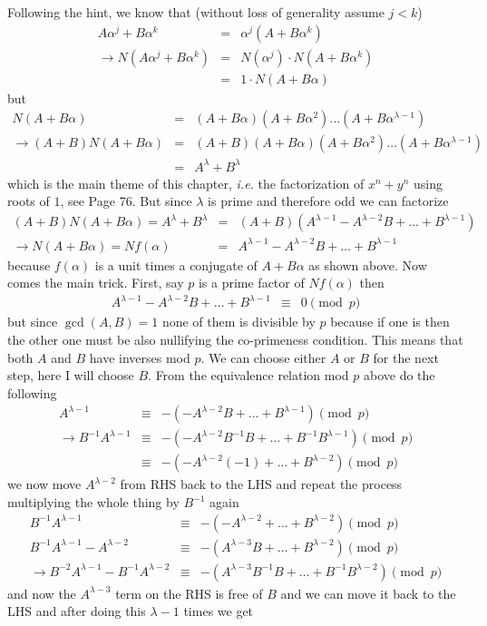 \documentclass[aps,preprint,preprintnumbers,nofootinbib,showpacs,prd]{revtex4-1}
\newcommand{\ie}{{\it i.e.} }
\newcommand{\nbea}{\begin{eqnarray*}}
\newcommand{\neea}{\end{eqnarray*}}
\begin{document}
Following the hint, we know that (without loss of generality assume $j < k$)
%
\nbea
A\alpha^j + B\alpha^k & = & \alpha^j(A + B\alpha^k) \\
\to N(A\alpha^j + B\alpha^k) & = & N(\alpha^j) \cdot N(A + B\alpha^k) \\
& = & 1 \cdot N(A + B\alpha)
\neea
%
but 
%
\nbea
N(A + B\alpha) & = & (A + B\alpha) (A + B\alpha^2) \dots (A + B\alpha^{\lambda-1}) \\
\to (A + B)N(A + B\alpha) & = & (A + B)(A + B\alpha) (A + B\alpha^2) \dots (A + B\alpha^{\lambda-1}) \\
& = & A^\lambda + B^\lambda
\neea
%
which is the main theme of this chapter, \ie the factorization of $x^n + y^n$ using roots of $1$, see Page 76. But since $\lambda$ is prime and therefore odd we can factorize
%
\nbea
(A + B)N(A + B\alpha) = A^\lambda + B^\lambda & = & (A + B)(A^{\lambda-1} - A^{\lambda-2}B + \dots + B^{\lambda - 1}) \\
\to N(A + B\alpha) = Nf(\alpha) & = & A^{\lambda-1} - A^{\lambda-2}B + \dots + B^{\lambda - 1}
\neea
%
because $f(\alpha)$ is a unit times a conjugate of $A + B\alpha$ as shown above. Now comes the main trick. First, say $p$ is a prime factor of $Nf(\alpha)$ then 
%
\nbea
A^{\lambda-1} - A^{\lambda-2}B + \dots + B^{\lambda - 1} & \equiv & 0 \pmod{p}
\neea
%
but since $\gcd(A,B) = 1$ none of them is divisible by $p$ because if one is then the other one must be also nullifying the co-primeness condition. This means that both $A$ and $B$ have inverses mod $p$. We can choose either $A$ or $B$ for the next step, here I will choose $B$. From the equivalence relation mod $p$ above do the following
%
\nbea
A^{\lambda-1}  & \equiv & -(- A^{\lambda-2}B + \dots + B^{\lambda - 1}) \pmod{p} \\
\to B^{-1}A^{\lambda-1}  & \equiv & -(- A^{\lambda-2}B^{-1}B + \dots + B^{-1}B^{\lambda - 1}) \pmod{p} \\
& \equiv & -(- A^{\lambda-2}(-1) + \dots + B^{\lambda - 2}) \pmod{p}
\neea
%
we now move $A^{\lambda-2}$ from RHS back to the LHS and repeat the process multiplying the whole thing by $B^{-1}$ again
%
\nbea
B^{-1}A^{\lambda-1} & \equiv & -(- A^{\lambda-2} + \dots + B^{\lambda - 2}) \pmod{p} \\
B^{-1}A^{\lambda-1} - A^{\lambda - 2} & \equiv & -(A^{\lambda-3}B + \dots + B^{\lambda - 2}) \pmod{p} \\
\to B^{-2}A^{\lambda-1} - B^{-1}A^{\lambda - 2} & \equiv & -(A^{\lambda-3}B^{-1}B + \dots + B^{-1}B^{\lambda - 2}) \pmod{p}
\neea
%
and now the $A^{\lambda-3}$ term on the RHS is free of $B$ and we can move it back to the LHS and after doing this $\lambda - 1$ times we get
\end{document}
